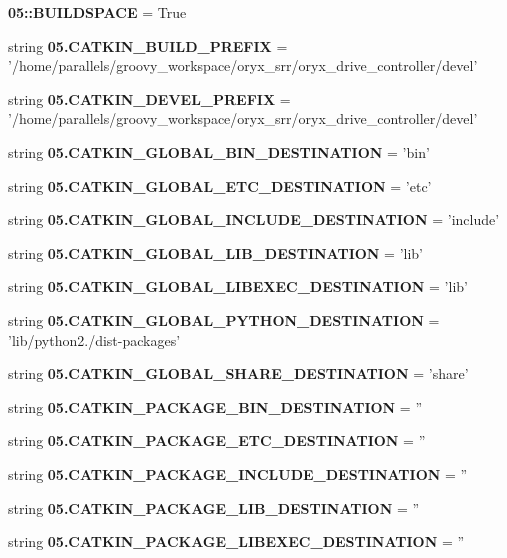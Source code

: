 \begin{DoxyCompactItemize}
\item 
{\bf 05\-::\-B\-U\-I\-L\-D\-S\-P\-A\-C\-E} = \-True
\item 
string {\bf 05.\-C\-A\-T\-K\-I\-N\-\_\-\-B\-U\-I\-L\-D\-\_\-\-P\-R\-E\-F\-I\-X} = '/home/parallels/groovy\-\_\-workspace/oryx\-\_\-srr/oryx\-\_\-drive\-\_\-controller/devel'
\item 
string {\bf 05.\-C\-A\-T\-K\-I\-N\-\_\-\-D\-E\-V\-E\-L\-\_\-\-P\-R\-E\-F\-I\-X} = '/home/parallels/groovy\-\_\-workspace/oryx\-\_\-srr/oryx\-\_\-drive\-\_\-controller/devel'
\item 
string {\bf 05.\-C\-A\-T\-K\-I\-N\-\_\-\-G\-L\-O\-B\-A\-L\-\_\-\-B\-I\-N\-\_\-\-D\-E\-S\-T\-I\-N\-A\-T\-I\-O\-N} = 'bin'
\item 
string {\bf 05.\-C\-A\-T\-K\-I\-N\-\_\-\-G\-L\-O\-B\-A\-L\-\_\-\-E\-T\-C\-\_\-\-D\-E\-S\-T\-I\-N\-A\-T\-I\-O\-N} = 'etc'
\item 
string {\bf 05.\-C\-A\-T\-K\-I\-N\-\_\-\-G\-L\-O\-B\-A\-L\-\_\-\-I\-N\-C\-L\-U\-D\-E\-\_\-\-D\-E\-S\-T\-I\-N\-A\-T\-I\-O\-N} = 'include'
\item 
string {\bf 05.\-C\-A\-T\-K\-I\-N\-\_\-\-G\-L\-O\-B\-A\-L\-\_\-\-L\-I\-B\-\_\-\-D\-E\-S\-T\-I\-N\-A\-T\-I\-O\-N} = 'lib'
\item 
string {\bf 05.\-C\-A\-T\-K\-I\-N\-\_\-\-G\-L\-O\-B\-A\-L\-\_\-\-L\-I\-B\-E\-X\-E\-C\-\_\-\-D\-E\-S\-T\-I\-N\-A\-T\-I\-O\-N} = 'lib'
\item 
string {\bf 05.\-C\-A\-T\-K\-I\-N\-\_\-\-G\-L\-O\-B\-A\-L\-\_\-\-P\-Y\-T\-H\-O\-N\-\_\-\-D\-E\-S\-T\-I\-N\-A\-T\-I\-O\-N} = 'lib/python2./dist-\/packages'
\item 
string {\bf 05.\-C\-A\-T\-K\-I\-N\-\_\-\-G\-L\-O\-B\-A\-L\-\_\-\-S\-H\-A\-R\-E\-\_\-\-D\-E\-S\-T\-I\-N\-A\-T\-I\-O\-N} = 'share'
\item 
string {\bf 05.\-C\-A\-T\-K\-I\-N\-\_\-\-P\-A\-C\-K\-A\-G\-E\-\_\-\-B\-I\-N\-\_\-\-D\-E\-S\-T\-I\-N\-A\-T\-I\-O\-N} = ''
\item 
string {\bf 05.\-C\-A\-T\-K\-I\-N\-\_\-\-P\-A\-C\-K\-A\-G\-E\-\_\-\-E\-T\-C\-\_\-\-D\-E\-S\-T\-I\-N\-A\-T\-I\-O\-N} = ''
\item 
string {\bf 05.\-C\-A\-T\-K\-I\-N\-\_\-\-P\-A\-C\-K\-A\-G\-E\-\_\-\-I\-N\-C\-L\-U\-D\-E\-\_\-\-D\-E\-S\-T\-I\-N\-A\-T\-I\-O\-N} = ''
\item 
string {\bf 05.\-C\-A\-T\-K\-I\-N\-\_\-\-P\-A\-C\-K\-A\-G\-E\-\_\-\-L\-I\-B\-\_\-\-D\-E\-S\-T\-I\-N\-A\-T\-I\-O\-N} = ''
\item 
string {\bf 05.\-C\-A\-T\-K\-I\-N\-\_\-\-P\-A\-C\-K\-A\-G\-E\-\_\-\-L\-I\-B\-E\-X\-E\-C\-\_\-\-D\-E\-S\-T\-I\-N\-A\-T\-I\-O\-N} = ''

\end{DoxyCompactItemize}
